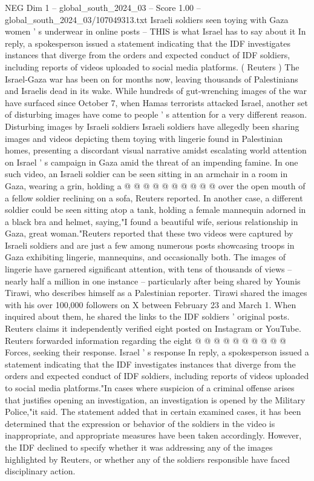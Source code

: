 \begin{textsample}{NEG Dim 1 – global\_south\_2024\_03 – Score 1.00 – global\_south\_2024\_03/107049313.txt}  \label{ex:f1_neg_114}
Israeli soldiers seen toying with Gaza women ' s underwear in online posts -- THIS is what Israel has to say about it In reply, a spokesperson issued a statement indicating that the IDF investigates instances that diverge from the orders and expected conduct of IDF soldiers, including reports of videos uploaded to social media platforms. ( Reuters ) The Israel-Gaza war has been on for months now, leaving thousands of Palestinians and Israelis dead in its wake.
While hundreds of gut-wrenching images of the war have surfaced since October 7, when Hamas terrorists attacked Israel, another set of disturbing images have come to people ' s attention for a very different reason.
Disturbing images by Israeli soldiers Israeli soldiers have allegedly been sharing images and videos depicting them toying with lingerie found in Palestinian homes, presenting a discordant visual narrative amidst escalating world attention on Israel ' s campaign in Gaza amid the threat of an impending famine.
In one such video, an Israeli soldier can be seen sitting in an armchair in a room in Gaza, wearing a grin, holding a @ @ @ @ @ @ @ @ @ @ over the open mouth of a fellow soldier reclining on a sofa, Reuters reported.
In another case, a different soldier could be seen sitting atop a tank, holding a female mannequin adorned in a black bra and helmet, saying,"I found a beautiful wife, serious relationship in Gaza, great woman."Reuters reported that these two videos were captured by Israeli soldiers and are just a few among numerous posts showcasing troops in Gaza exhibiting lingerie, mannequins, and occasionally both.
The images of lingerie have garnered significant attention, with tens of thousands of views -- nearly half a million in one instance -- particularly after being shared by Younis Tirawi, who describes himself as a Palestinian reporter.
Tirawi shared the images with his over 100,000 followers on X between February 23 and March 1.
When inquired about them, he shared the links to the IDF soldiers ' original posts.
Reuters claims it independently verified eight posted on Instagram or YouTube.
Reuters forwarded information regarding the eight @ @ @ @ @ @ @ @ @ @ Forces, seeking their response.
Israel ' s response In reply, a spokesperson issued a statement indicating that the IDF investigates instances that diverge from the orders and expected conduct of IDF soldiers, including reports of videos uploaded to social media platforms."In cases where suspicion of a criminal offense arises that justifies opening an investigation, an investigation is opened by the Military Police,"it said.
The statement added that in certain examined cases, it has been determined that the expression or behavior of the soldiers in the video is inappropriate, and appropriate measures have been taken accordingly.
However, the IDF declined to specify whether it was addressing any of the images highlighted by Reuters, or whether any of the soldiers responsible have faced disciplinary action.

\end{textsample}
